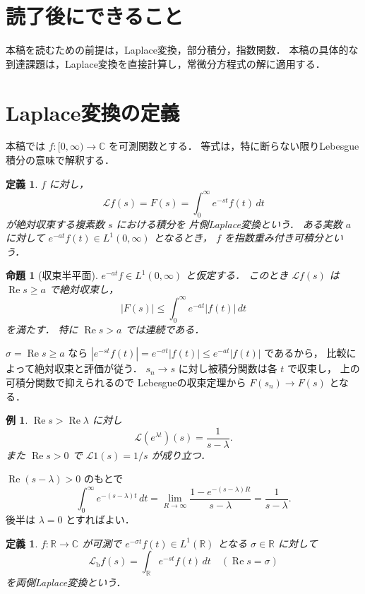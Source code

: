 \documentclass[a5paper,10pt,onecolumn]{jsarticle}
\makeatletter
\theoremstyle{mathnotetheorem}
\newtheorem{definition}[theorem]{定義}
\newtheorem{proposition}[theorem]{命題}
\newtheorem{example}[theorem]{例}
\renewcommand{\proofname}{証明}
\renewenvironment{proof}[1][\proofname]{%
  \par\pushQED{\qed}\normalfont\topsep4\p@\@plus2\p@\relax
  \trivlist\item[\hskip\labelsep\bfseries #1]\ignorespaces
}{\popQED\endtrivlist\@endpefalse}
\makeatother
\begin{document}
\section*{読了後にできること}
本稿を読むための前提は，Laplace変換，部分積分，指数関数．
本稿の具体的な到達課題は，Laplace変換を直接計算し，常微分方程式の解に適用する．

\section{Laplace変換の定義}

本稿では $f:[0,\infty)\to\mathbb C$ を可測関数とする．
等式は，特に断らない限りLebesgue積分の意味で解釈する．

\begin{definition}
$f$ に対し，
\[
 \mathcal Lf(s)=F(s)=\int_0^\infty e^{-st}f(t)\,dt
\]
が絶対収束する複素数 $s$ における積分を
\emph{片側Laplace変換}という．
ある実数 $a$ に対して
$e^{-at}f(t)\in L^1(0,\infty)$ となるとき，
$f$ を\emph{指数重み付き可積分}という．
\end{definition}

\begin{proposition}[収束半平面]\label{prop:half-plane}
$e^{-at}f\in L^1(0,\infty)$ と仮定する．
このとき $\mathcal Lf(s)$ は
$\operatorname{Re}s\ge a$ で絶対収束し，
\[
 |F(s)|\le\int_0^\infty e^{-at}|f(t)|\,dt
\]
を満たす．
特に $\operatorname{Re}s>a$ では連続である．
\end{proposition}
\begin{proof}
$\sigma=\operatorname{Re}s\ge a$ なら
$|e^{-st}f(t)|=e^{-\sigma t}|f(t)|
\le e^{-at}|f(t)|$ であるから，
比較によって絶対収束と評価が従う．
$s_n\to s$ に対し被積分関数は各 $t$ で収束し，
上の可積分関数で抑えられるので
Lebesgueの収束定理から $F(s_n)\to F(s)$ となる．
\end{proof}

\begin{example}
$\operatorname{Re}s>\operatorname{Re}\lambda$ に対し
\[
 \mathcal L(e^{\lambda t})(s)=\frac1{s-\lambda}.
\]
また $\operatorname{Re}s>0$ で
$\mathcal L1(s)=1/s$ が成り立つ．
\end{example}
\begin{proof}
$\operatorname{Re}(s-\lambda)>0$ のもとで
\[
 \int_0^\infty e^{-(s-\lambda)t}\,dt
 =\lim_{R\to\infty}
 \frac{1-e^{-(s-\lambda)R}}{s-\lambda}
 =\frac1{s-\lambda}.
\]
後半は $\lambda=0$ とすればよい．
\end{proof}

\begin{definition}
$f:\mathbb R\to\mathbb C$ が可測で
$e^{-\sigma t}f(t)\in L^1(\mathbb R)$ となる
$\sigma\in\mathbb R$ に対して
\[
 \mathcal L_{\mathrm b}f(s)
 =\int_{\mathbb R}e^{-st}f(t)\,dt
 \quad(\operatorname{Re}s=\sigma)
\]
を\emph{両側Laplace変換}という．
\end{definition}
\end{document}
